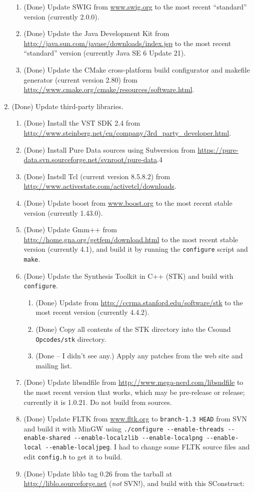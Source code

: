 \documentclass[11pt,letterpaper,onecolumn]{scrartcl}
\begin{document}
\begin{sloppypar}
\begin{enumerate}
\begin{enumerate}
	    \item (Done) Update SWIG from \url{www.swig.org} to the most recent ``standard'' version (currently 2.0.0).
	    \item (Done) Update the Java Development Kit from \url{http://java.sun.com/javase/downloads/index.jsp} to the most recent ``standard'' version (currently Java SE 6 Update 21).
	    \item (Done) Update the CMake cross-platform build configurator and makefile generator (current version 2.80) from \url{http://www.cmake.org/cmake/resources/software.html}.
		\end{enumerate}    
	\item (Done) Update third-party libraries.   
		\begin{enumerate}
    	\item (Done) Install the VST SDK 2.4 from \url{http://www.steinberg.net/en/company/3rd_party_developer.html}.
    	\item (Done) Install Pure Data sources using Subversion from \url{https://pure-data.svn.sourceforge.net/svnroot/pure-data}.4
    	\item (Done) Instsll Tcl (current version 8.5.8.2) from \url{http://www.activestate.com/activetcl/downloads}.
   		\item (Done) Update boost from \url{www.boost.org} to the most recent stable version (currently 1.43.0).
  		\item (Done) Update Gmm++ from \url{http://home.gna.org/getfem/download.html} to the most recent stable version (currently 4.1), and build it by running the \texttt{configure} script and \texttt{make}.
    	\item (Done) Update the Synthesis Toolkit in C++ (STK) and build with \texttt{configure}.
				\begin{enumerate}
					\item (Done) Update from \url{http://ccrma.stanford.edu/software/stk} to the most recent version (currently 4.4.2). 
					\item (Done) Copy all contents of the STK directory into the Csound \texttt{Opcodes/stk} directory.
					\item (Done -- I didn't see any.) Apply any patches from the web site and mailing list. 
				\end{enumerate}   	
			\item (Done) Update libsndfile from \url{http://www.mega-nerd.com/libsndfile} to the most recent version that works, which may be pre-release or release; currently it is 1.0.21. Do not build from sources. 
    	\item (Done) Update FLTK from \url{www.fltk.org} to \texttt{branch-1.3 HEAD} from SVN and build it with MinGW using \verb|./configure --enable-threads --enable-shared --enable-localzlib --enable-localpng --enable-local --enable-localjpeg|. I had to change some FLTK source files and edit \texttt{config.h} to get it to build.
     	\item (Done) Update liblo tag 0.26 from the tarball at \url{http://liblo.sourceforge.net} (\emph{not} SVN!), and build with this SConstruct:
    	

\end{enumerate}
\end{enumerate}
\end{sloppypar}
\end{document}
